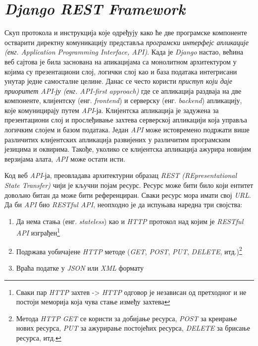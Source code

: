 \documentclass[12pt,oneside]{memoir}
\begin{document}
\section{\textit{Django REST Framework}}

Скуп протокола и инструкција које одређују како ће две програмске компоненте остварити директну комуникацију представља \textit{програмски интерфејс апликације (енг. Application Programming Interface, API)}. Када је \textit{Django} настао, већина веб сајтова је била заснована 
на апикацијама са монолитном архитектуром у којима су презентациони слој, логички слој као и база података интегрисани унутар једне самосталне целине.
Данас се често користи \textit{приступ који даје приоритет API-ју (енг. API-first approach)} где се апликација раздваја на две компоненте, клијентску (енг. \textit{frontend}) и серверску (енг. \textit{backend}) апликацију, које комуницирају путем \textit{API}-ја. Клијентска апликација је задужена за презентациони слој и прослеђивање захтева серверској апликацији која управља логичким слојем и базом података. Један \textit{API} може истовремено подржати више различитих клијентских апликација развијених у различитим програмским језицима и оквирима. Такође, уколико се клијентска апликација ажурира новијим верзијама алата, \textit{API} може остати исти.

Код веб \textit{API}-ја, преовладава архитектурни образац \textit{REST (REpresentational State Transfer)} \cite{restful_web_apis} чији је кључни појам ресурс. Ресурс може бити било који ентитет довољно битан да може бити референциран. Сваки ресурс мора имати свој \textit{URL}. Да би \textit{API} био \textit{RESTful API}, неопходно је да испуњава наредна три својства:
\begin{enumerate}
    \item Да нема стања (енг. \textit{stateless}) као и \textit{HTTP} протокол над којим је \textit{RESTful API} изграђен\footnote{Сваки пар \textit{HTTP} захтев -> \textit{HTTP} одговор је независан од претходног и не постоји меморија која чува стање између захтева}
    \item Подржава уобичајене \textit{HTTP} методе (\textit{GET}, \textit{POST}, \textit{PUT}, \textit{DELETE}, итд.)\footnote{Метода \textit{HTTP GET} се користи за добијање ресурса, \textit{POST} за креирање нових ресурса, \textit{PUT} за ажурирање постојећих ресурса, \textit{DELETE} за брисање ресурса, итд.}
    \item Враћа податке у \textit{JSON} или \textit{XML} формату
\end{enumerate}
\end{document}
